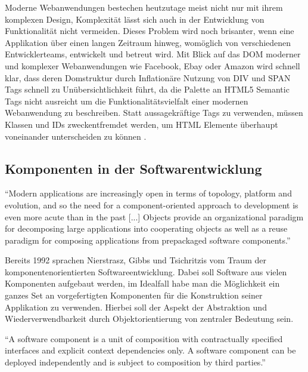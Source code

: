 Moderne Webanwendungen bestechen heutzutage meist nicht nur mit ihrem komplexen Design, Komplexität lässt sich auch in der Entwicklung
von Funktionalität nicht vermeiden. Dieses Problem wird noch brisanter, wenn eine Applikation über einen langen Zeitraum hinweg,
womöglich von verschiedenen Entwicklerteams, entwickelt und betreut wird. Mit Blick auf das \ac{DOM} moderner und komplexer Webanwendungen wie Facebook, Ebay oder Amazon
wird schnell klar, dass deren Domstruktur durch Inflationäre Nutzung von DIV und SPAN Tags schnell zu Unübersichtlichkeit führt,
da die Palette an HTML5 Semantic Tags nicht ausreicht um die Funktionalitätsvielfalt einer modernen Webanwendung zu beschreiben.
Statt aussagekräftige Tags zu verwenden, müssen Klassen und IDs zweckentfremdet werden, um HTML Elemente überhaupt voneinander unterscheiden zu können
\cite{sitepoint-introduction-to-webcomponents}.

\subsection{Komponenten in der Softwarentwicklung}

``Modern applications are increasingly
open in terms of topology,
platform and evolution, and so the
need for a component-oriented
approach to development is even
more acute than in the past [...]  Objects provide an organizational
paradigm for decomposing large
applications into cooperating objects
as well as a reuse paradigm for
composing applications from prepackaged
software components.''
\cite{nierstrasz1992component}

\vspace{0.5cm}

Bereits 1992 sprachen Nierstrasz, Gibbs und Tsichritzis vom Traum der komponentenorientierten Softwareentwicklung.
Dabei soll Software aus vielen Komponenten aufgebaut werden, im Idealfall habe man die Möglichkeit ein
ganzes Set an vorgefertigten Komponenten für die Konstruktion seiner Applikation zu verwenden.
Hierbei soll der Aspekt der Abstraktion und Wiederverwendbarkeit durch Objektorientierung von zentraler Bedeutung sein.

\vspace{0.5cm}
``A software component is a unit of composition with contractually specified interfaces and explicit
context dependencies only. A software component can be deployed independently and is subject to composition
by third parties.''
\cite{Szyperski}
\vspace{0.5cm}

